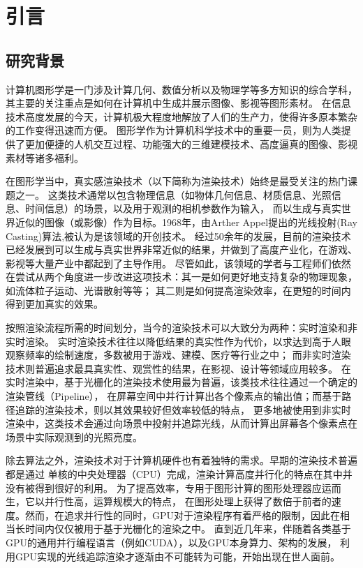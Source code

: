 \chapter{引言}
\label{cha:introduction}

\section{研究背景}

计算机图形学是一门涉及计算几何、数值分析以及物理学等多方知识的综合学科，其主要的关注重点是如何在计算机中生成并展示图像、影视等图形素材。
在信息技术高度发展的今天，计算机极大程度地解放了人们的生产力，使得许多原本繁杂的工作变得迅速而方便。
图形学作为计算机科学技术中的重要一员，则为人类提供了更加便捷的人机交互过程、功能强大的三维建模技术、高度逼真的图像、影视素材等诸多福利。

在图形学当中，真实感渲染技术（以下简称为渲染技术）始终是最受关注的热门课题之一。
这类技术通常以包含物理信息（如物体几何信息、材质信息、光照信息、时间信息）的场景，以及用于观测的相机参数作为输入，
而以生成与真实世界近似的图像（或影像）作为目标。1968年，由Arther Appel提出的光线投射(Ray Casting)算法\cite{???},被认为是该领域的开创技术。
经过50余年的发展，目前的渲染技术已经发展到可以生成与真实世界非常近似的结果，并做到了高度产业化，在游戏、影视等大量产业中都起到了主导作用。
尽管如此，该领域的学者与工程师们依然在尝试从两个角度进一步改进这项技术：其一是如何更好地支持复杂的物理现象，如流体粒子运动、光谱散射等等；
其二则是如何提高渲染效率，在更短的时间内得到更加真实的效果。

按照渲染流程所需的时间划分，当今的渲染技术可以大致分为两种：实时渲染和非实时渲染。
实时渲染技术往往以降低结果的真实性作为代价，以求达到高于人眼观察频率的绘制速度，多数被用于游戏、建模、医疗等行业之中；
而非实时渲染技术则普遍追求最具真实性、观赏性的结果，在影视、设计等领域应用较多。
在实时渲染中，基于光栅化的渲染技术使用最为普遍，该类技术往往通过一个确定的渲染管线（Pipeline），
在屏幕空间中并行计算出各个像素点的输出值；而基于路径追踪的渲染技术，则以其效果较好但效率较低的特点，
更多地被使用到非实时渲染中，这类技术会通过向场景中投射并追踪光线，从而计算出屏幕各个像素点在场景中实际观测到的光照亮度。

除去算法之外，渲染技术对于计算机硬件也有着独特的需求。早期的渲染技术普遍都是通过
单核的中央处理器（CPU）完成，渲染计算高度并行化的特点在其中并没有被得到很好的利用。
为了提高效率，专用于图形计算的图形处理器应运而生，它以并行性高，运算规模大的特点，
在图形处理上获得了数倍于前者的速度。然而，在追求并行性的同时，GPU对于渲染程序有着严格的限制，因此在相当长时间内仅仅被用于基于光栅化的渲染之中。
直到近几年来，伴随着各类基于GPU的通用并行编程语言（例如CUDA），以及GPU本身算力、架构的发展，
利用GPU实现的光线追踪渲染才逐渐由不可能转为可能，开始出现在世人面前。

